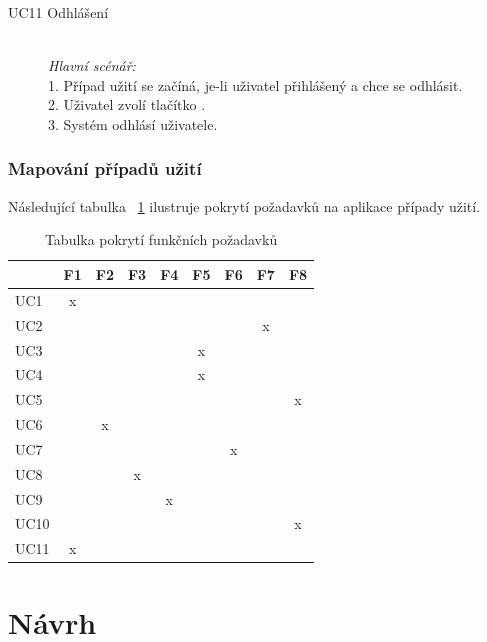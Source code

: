 \documentclass[thesis=B,czech]{FITthesis}[2012/06/26]
\begin{document}
\begin{description}
	
	\item[UC11 Odhlášení] \hspace*{\fill} \\
	\textit{Hlavní scénář:}
	\\	
	1. Případ užití se začíná, je-li uživatel přihlášený a chce se odhlásit. \\
	2. Uživatel zvolí tlačítko .\\
	3. Systém odhlásí uživatele.
		
\end{description}

\subsection{Mapování případů užití}

Následující tabulka ~\ref{tab:cover} ilustruje pokrytí požadavků na aplikace případy užití.

\begin{table}[h]\centering
	\caption[Tabulka pokrytí funkčních požadavků]{Tabulka pokrytí funkčních požadavků}\label{tab:cover}
	\begin{center}
		\begin{tabular}{|l||c|c|c|c|c|c|c|c|}
			\hline
			& F1 & F2 & F3 & F4 & F5 & F6 & F7 & F8\\ \hline \hline
			UC1  & x & & & & & & & \\ \hline
			UC2  & & & & &  & & x &\\ \hline
			UC3  & & & & & x & & &\\ \hline
			UC4  & & & & & x & & & \\ \hline
			UC5  & & & & & & & & x\\ \hline
			UC6  & & x & & & & & &\\ \hline
			UC7  & & & & & & x & & \\ \hline
			UC8  & & & x & & & & & \\ \hline
			UC9  & & & & x & & & &  \\ \hline
			UC10  & & & & & & & & x \\ \hline
			UC11  & x & & & & & & & \\ \hline
			
		\end{tabular}
	\end{center}
\end{table}
\newpage

\chapter{Návrh}
\end{document}
